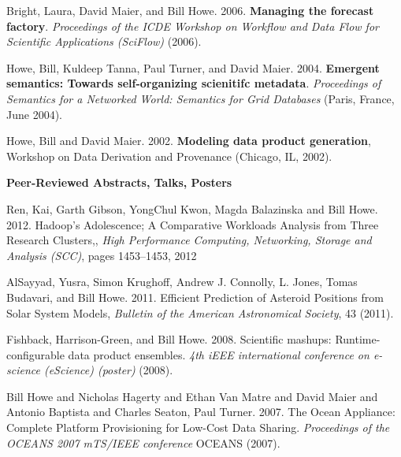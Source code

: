 \begin{bulletlist}
\item Bright, Laura, David Maier, and Bill Howe. 2006. \textbf{Managing the
forecast factory}. \emph{Proceedings of the ICDE Workshop on Workflow and
Data Flow for Scientific Applications (SciFlow)} (2006). 

\item Howe, Bill, Kuldeep Tanna, Paul Turner, and David Maier. 2004.
\textbf{Emergent semantics: Towards self-organizing scienitifc metadata}.
\emph{Proceedings of Semantics for a Networked World: Semantics for Grid
Databases} (Paris, France, June 2004). 

\item Howe, Bill and David Maier. 2002. \textbf{Modeling data product generation},
Workshop on Data Derivation and Provenance (Chicago, IL, 2002).
\end{bulletlist}

{\bf Peer-Reviewed Abstracts, Talks, Posters}
\begin{bulletlist}

\item Ren, Kai, Garth Gibson, YongChul Kwon, Magda Balazinska and Bill Howe. 2012.
Hadoop's Adolescence; A Comparative Workloads Analysis from Three Research Clusters,,
\emph{High Performance Computing, Networking, Storage and Analysis (SCC)}, 
pages 1453--1453, 2012

\item AlSayyad, Yusra, Simon Krughoff, Andrew J. Connolly,  L. Jones, Tomas Budavari, and Bill Howe. 2011. Efficient Prediction of Asteroid Positions from Solar System Models, 
\emph{Bulletin of the American Astronomical Society}, 43 (2011).

\item Fishback, Harrison-Green, and Bill Howe. 2008. Scientific mashups:
Runtime-configurable data product ensembles. \emph{4th iEEE
international conference on e-science (eScience) (poster)} (2008).

\item Bill Howe and Nicholas
Hagerty and Ethan Van Matre and David Maier and Antonio Baptista and
Charles Seaton, Paul Turner. 2007. The Ocean Appliance: Complete
Platform Provisioning for Low-Cost Data Sharing. \emph{Proceedings of
the OCEANS 2007 mTS/IEEE conference} OCEANS (2007). 

\end{bulletlist}

